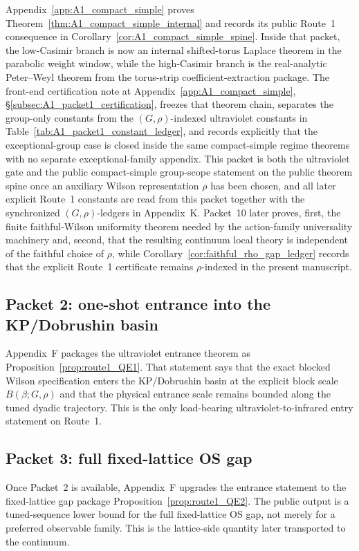 Appendix~\ref{app:A1_compact_simple} proves Theorem~\ref{thm:A1_compact_simple_internal} and records its public Route~1 consequence in Corollary~\ref{cor:A1_compact_simple_spine}.
Inside that packet, the low-Casimir branch is now an internal shifted-torus Laplace theorem in the parabolic weight window, while the high-Casimir branch is the real-analytic Peter--Weyl theorem from the torus-strip coefficient-extraction package.
The front-end certification note at Appendix~\ref{app:A1_compact_simple}, \S\ref{subsec:A1_packet1_certification}, freezes that theorem chain, separates the group-only constants from the $(G,\rho)$-indexed ultraviolet constants in Table~\ref{tab:A1_packet1_constant_ledger}, and records explicitly that the exceptional-group case is closed inside the same compact-simple regime theorems with no separate exceptional-family appendix.
This packet is both the ultraviolet gate and the public compact-simple group-scope statement on the public theorem spine once an auxiliary Wilson representation $\rho$ has been chosen, and all later explicit Route~1 constants are read from this packet together with the synchronized $(G,\rho)$-ledgers in Appendix~K.
Packet~10 later proves, first, the finite faithful-Wilson uniformity theorem needed by the action-family universality machinery and, second, that the resulting continuum local theory is independent of the faithful choice of $\rho$, while Corollary~\ref{cor:faithful_rho_gap_ledger} records that the explicit Route~1 certificate remains $\rho$-indexed in the present manuscript.

\subsection{Packet 2: one-shot entrance into the KP/Dobrushin basin}

Appendix~F packages the ultraviolet entrance theorem as Proposition~\ref{prop:route1_QE1}.
That statement says that the exact blocked Wilson specification enters the KP/Dobrushin basin at the explicit block scale $B(\beta;G,\rho)$ and that the physical entrance scale remains bounded along the tuned dyadic trajectory.
This is the only load-bearing ultraviolet-to-infrared entry statement on Route~1.

\subsection{Packet 3: full fixed-lattice OS gap}

Once Packet~2 is available, Appendix~F upgrades the entrance statement to the fixed-lattice gap package Proposition~\ref{prop:route1_QE2}.
The public output is a tuned-sequence lower bound for the full fixed-lattice OS gap, not merely for a preferred observable family.
This is the lattice-side quantity later transported to the continuum.

